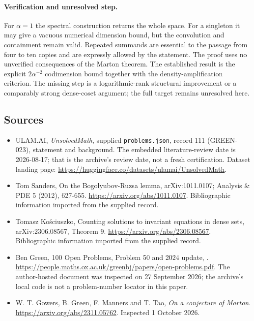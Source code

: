 \documentclass[11pt,a4paper]{article}
\begin{document}
\paragraph{Verification and unresolved step.}
For $\alpha=1$ the spectral construction returns the whole space. For a singleton it may give a vacuous numerical dimension bound, but the convolution and containment remain valid. Repeated summands are essential to the passage from four to ten copies and are expressly allowed by the statement. The proof uses no unverified consequences of the Marton theorem. The established result is the explicit $2\alpha^{-2}$ codimension bound together with the density-amplification criterion. The missing step is a logarithmic-rank structural improvement or a comparably strong dense-coset argument; the full target remains unresolved here.

\subsection{Sources}

{\small

\begin{itemize}

\item[\hypertarget{source:111:1}{S1}] ULAM.AI, \emph{UnsolvedMath}, supplied \texttt{problems.json}, record 111 (GREEN-023), statement and background. The embedded literature-review date is 2026-08-17; that is the archive’s review date, not a fresh certification. Dataset landing page: \url{https://huggingface.co/datasets/ulamai/UnsolvedMath}.

\item[\hypertarget{source:111:2}{S2}] Tom Sanders, On the Bogolyubov-Ruzsa lemma, arXiv:1011.0107; Analysis \& PDE 5 (2012), 627-655. \url{https://arxiv.org/abs/1011.0107}. Bibliographic information imported from the supplied record.

\item[\hypertarget{source:111:3}{S3}] Tomasz Kościuszko, Counting solutions to invariant equations in dense sets, arXiv:2306.08567, Theorem 9. \url{https://arxiv.org/abs/2306.08567}. Bibliographic information imported from the supplied record.

\item[\hypertarget{source:111:4}{S4}] Ben Green, 100 Open Problems, Problem 50 and 2024 update, . \url{https://people.maths.ox.ac.uk/greenbj/papers/open-problems.pdf}. The author-hosted document was inspected on 27 September 2026; the archive’s local code is not a problem-number locator in this paper.

\item[E1] W. T. Gowers, B. Green, F. Manners and T. Tao, \emph{On a conjecture of Marton}. \url{https://arxiv.org/abs/2311.05762}. Inspected 1 October 2026.

\end{itemize}

}

\label{end:111}
\end{document}
